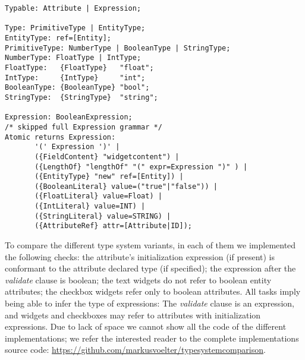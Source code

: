 \begin{lstlisting}[language=xtext,float,label=lst:grammar-plain-types-and-ex,caption=Types
and Expressions.] 
Typable: Attribute | Expression;

Type: PrimitiveType | EntityType;
EntityType: ref=[Entity];
PrimitiveType: NumberType | BooleanType | StringType;
NumberType: FloatType | IntType;
FloatType:   {FloatType}   "float";
IntType:     {IntType}     "int";
BooleanType: {BooleanType} "bool";
StringType:	 {StringType}  "string";

Expression: BooleanExpression;
/* skipped full Expression grammar */
Atomic returns Expression:
       '(' Expression ')' |
       ({FieldContent} "widgetcontent") |
       ({LengthOf} "lengthOf" "(" expr=Expression ")" ) |
       ({EntityType} "new" ref=[Entity]) | 
       ({BooleanLiteral} value=("true"|"false")) |
       ({FloatLiteral} value=Float) |
       ({IntLiteral} value=INT) |
       ({StringLiteral} value=STRING) |
       ({AttributeRef} attr=[Attribute|ID]);
\end{lstlisting}

%




To compare the different type system variants, in each of them we implemented
the following checks: the attribute's initialization expression (if present)
is conformant to the attribute declared type (if specified); the expression
after the \emph{validate} clause is boolean; the text widgets do not refer to
boolean entity attributes; the checkbox widgets refer only to boolean
attributes.
All tasks imply being able to infer the type of expressions: The \emph{validate}
clause is an expression, and widgets and checkboxes may refer to attributes with
initialization expressions.  Due to lack of space we cannot show all the code of
the different implementations; we refer the interested reader to the complete
implementations source code:
\url{https://github.com/markusvoelter/typesystemcomparison}.

